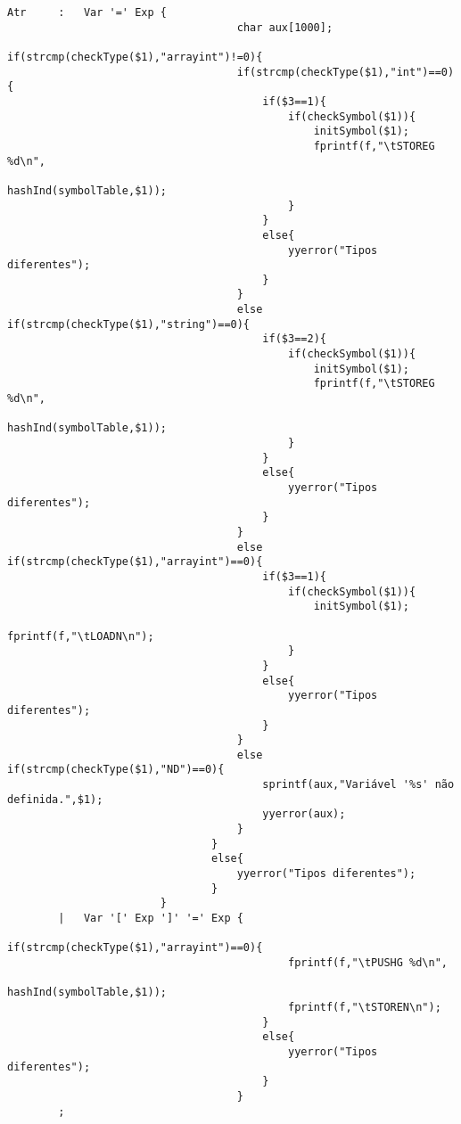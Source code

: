 \documentclass{report}
\begin{document}
\begin{verbatim}
Atr     :   Var '=' Exp {
                                    char aux[1000];
                                if(strcmp(checkType($1),"arrayint")!=0){
                                    if(strcmp(checkType($1),"int")==0){
                                        if($3==1){
                                            if(checkSymbol($1)){
                                                initSymbol($1);
                                                fprintf(f,"\tSTOREG %d\n", 
                                                    hashInd(symbolTable,$1));
                                            }
                                        }
                                        else{
                                            yyerror("Tipos diferentes");
                                        }
                                    }
                                    else if(strcmp(checkType($1),"string")==0){
                                        if($3==2){
                                            if(checkSymbol($1)){
                                                initSymbol($1);
                                                fprintf(f,"\tSTOREG %d\n", 
                                                    hashInd(symbolTable,$1));
                                            }
                                        }
                                        else{
                                            yyerror("Tipos diferentes");
                                        }
                                    }
                                    else if(strcmp(checkType($1),"arrayint")==0){
                                        if($3==1){
                                            if(checkSymbol($1)){
                                                initSymbol($1);
                                                fprintf(f,"\tLOADN\n");
                                            }
                                        }
                                        else{
                                            yyerror("Tipos diferentes");
                                        }
                                    }
                                    else if(strcmp(checkType($1),"ND")==0){
                                        sprintf(aux,"Variável '%s' não definida.",$1);
                                        yyerror(aux);
                                    }
                                }
                                else{
                                    yyerror("Tipos diferentes");
                                }
                        }
        |   Var '[' Exp ']' '=' Exp {
                                        if(strcmp(checkType($1),"arrayint")==0){
                                            fprintf(f,"\tPUSHG %d\n", 
                                                hashInd(symbolTable,$1));
                                            fprintf(f,"\tSTOREN\n");
                                        }
                                        else{
                                            yyerror("Tipos diferentes");
                                        }
                                    }
        ;


\end{verbatim}
\end{document}
